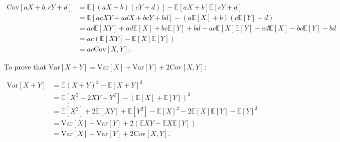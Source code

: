 \documentclass[10pt,leter,openany]{article}
\begin{document}
\begin{equation*}
	\begin{aligned}
\mbox{Cov}[a X + b, c Y + d] &= \mathbb{E}[(aX+b)(cY+d)] - \mathbb{E}[a X + b] \mathbb{E}[c Y + d]\\
&= \mathbb{E}[ac XY + ad   X + bc   Y + bd] - (a \mathbb{E}[X] + b)(c \mathbb{E}[Y] + d)\\
&= ac   \mathbb{E}[XY] + ad   \mathbb{E}[X] + bc    \mathbb{E}[Y] + bd - ac   \mathbb{E}[X] \mathbb{E}[Y] - ad   \mathbb{E}[X] - bc   \mathbb{E}[Y] - bd\\
&= ac(\mathbb{E}[XY] - \mathbb{E}[X] \mathbb{E}[Y])\\
&= ac   \mbox{Cov}[X, Y].
	\end{aligned}	
\end{equation*}

To prove that $\mbox{Var}[X+Y] = \mbox{Var}[X] + \mbox{Var}[Y] + 2\mbox{Cov}[X,Y]$:

\begin{equation*}
	\begin{aligned}
		\mbox{Var}[X+Y] &= \mathbb{E}{(X+Y)^2} - \mathbb{E}[X+Y]^2 \\
		&= \mathbb{E}[X^2 + 2 X Y + Y^2] - (\mathbb{E}[X] + \mathbb{E}[Y] )^2 \\
		&= \mathbb{E}[X^2] + 2 \mathbb{E}[XY] + \mathbb{E}[Y^2]  - \mathbb{E}[X]^2 - 2 \mathbb{E}[X] \mathbb{E}[Y]  - \mathbb{E}[Y]^2 \\
		&= \mbox{Var}[X] + \mbox{Var}[Y] + 2( \mathbb{E}{XY} - \mathbb{E}{X} \mathbb{E}[Y] ) \\
		&= \mbox{Var}[X] + \mbox{Var}[Y] + 2 \mbox{Cov}[X, Y]	.
	\end{aligned}	
\end{equation*}
			
\clearpage

	
	
\end{document}
